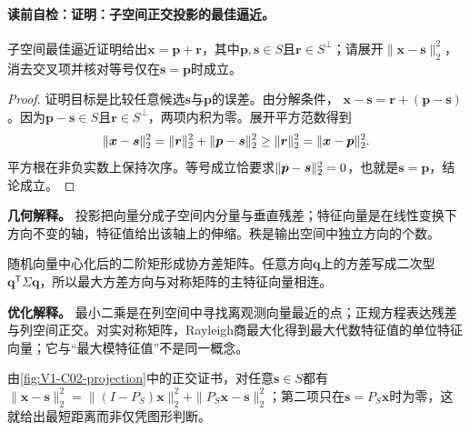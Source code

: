 \paragraph{读前自检：证明：子空间正交投影的最佳逼近。}子空间最佳逼近证明给出$\boldsymbol{x}=\boldsymbol p+\boldsymbol r$，其中$\boldsymbol p,\boldsymbol s\in S$且$\boldsymbol r\in S^\perp$；请展开$\lVert\boldsymbol{x}-\boldsymbol s\rVert_2^2$，消去交叉项并核对等号仅在$\boldsymbol s=\boldsymbol p$时成立。\par

\begin{proof}\label{schema:V1-C02:CH-13}
证明目标是比较任意候选$\boldsymbol{s}$与$\boldsymbol{p}$的误差。由分解条件，
$\boldsymbol{x}-\boldsymbol{s}=\boldsymbol{r}+(\boldsymbol{p}-\boldsymbol{s})$。因为$\boldsymbol{p}-\boldsymbol{s}\in S$且$\boldsymbol{r}\in S^{\perp}$，两项内积为零。展开平方范数得到
\[
\lVert\boldsymbol{x}-\boldsymbol{s}\rVert_2^2
=\lVert\boldsymbol{r}\rVert_2^2+\lVert\boldsymbol{p}-\boldsymbol{s}\rVert_2^2
\ge \lVert\boldsymbol{r}\rVert_2^2
=\lVert\boldsymbol{x}-\boldsymbol{p}\rVert_2^2.
\]
平方根在非负实数上保持次序。等号成立恰要求$\lVert\boldsymbol{p}-\boldsymbol{s}\rVert_2^2=0$，也就是$\boldsymbol{s}=\boldsymbol{p}$，结论成立。
\end{proof}

\begin{geometrybox}\label{schema:V1-C02:CH-14}
\textbf{几何解释。} 投影把向量分成子空间内分量与垂直残差；特征向量是在线性变换下方向不变的轴，特征值给出该轴上的伸缩。秩是输出空间中独立方向的个数。
\end{geometrybox}
\begin{probabilitybox}\label{schema:V1-C02:CH-15}
随机向量中心化后的二阶矩形成协方差矩阵。任意方向$\boldsymbol{q}$上的方差写成二次型$\boldsymbol{q}^{\mathsf T}\Sigma\boldsymbol{q}$，所以最大方差方向与对称矩阵的主特征向量相连。
\end{probabilitybox}
\begin{optimizationbox}\label{schema:V1-C02:CH-16}
\textbf{优化解释。} 最小二乘是在列空间中寻找离观测向量最近的点；正规方程表达残差与列空间正交。对实对称矩阵，Rayleigh商最大化得到最大代数特征值的单位特征向量；它与“最大模特征值”不是同一概念。
\end{optimizationbox}


由\cref{fig:V1-C02-projection}中的正交证书，对任意$\boldsymbol s\in S$都有
$\|\boldsymbol x-\boldsymbol s\|_2^2=\|(I-P_S)\boldsymbol x\|_2^2+\|P_S\boldsymbol x-\boldsymbol s\|_2^2$；第二项只在$\boldsymbol s=P_S\boldsymbol x$时为零，这就给出最短距离而非仅凭图形判断。

